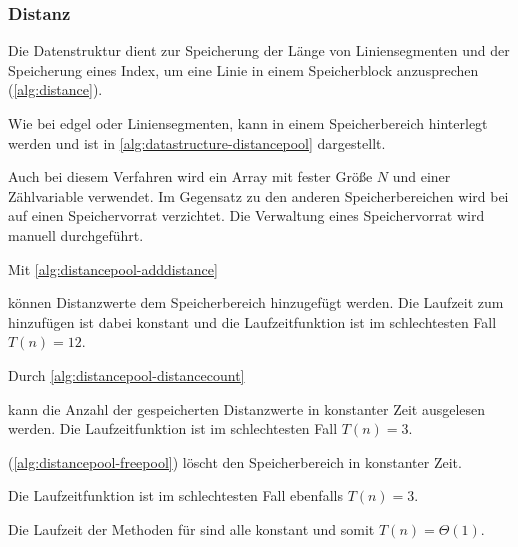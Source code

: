 \subsubsection{Distanz} %
\label{sub:distanz}

Die Datenstruktur  dient zur Speicherung der Länge von Liniensegmenten und der Speicherung eines
 Index, um eine Linie in einem Speicherblock anzusprechen (\autoref{alg:distance}).


Wie bei \gls{edgel} oder Liniensegmenten, kann  in einem Speicherbereich hinterlegt werden und ist
 in \autoref{alg:datastructure-distancepool} dargestellt.

Auch bei diesem Verfahren wird ein Array mit fester Größe $N$ und einer Zählvariable verwendet. Im Gegensatz zu den
 anderen Speicherbereichen wird bei  auf einen Speichervorrat verzichtet. Die Verwaltung eines
 Speichervorrat wird manuell durchgeführt.

Mit \autoref{alg:distancepool-adddistance}

können Distanzwerte dem Speicherbereich hinzugefügt werden. Die Laufzeit zum hinzufügen ist dabei konstant und die
 Laufzeitfunktion ist im schlechtesten Fall $T(n) = 12$.

Durch \autoref{alg:distancepool-distancecount}

 kann die Anzahl der gespeicherten Distanzwerte in konstanter Zeit ausgelesen werden. Die Laufzeitfunktion ist im schlechtesten Fall $T(n) = 3$.

 (\autoref{alg:distancepool-freepool}) löscht den Speicherbereich in konstanter Zeit.

Die Laufzeitfunktion ist im schlechtesten Fall ebenfalls $T(n) = 3$.

Die Laufzeit der Methoden für  sind alle konstant und somit $T(n)=\Theta(1)$.

